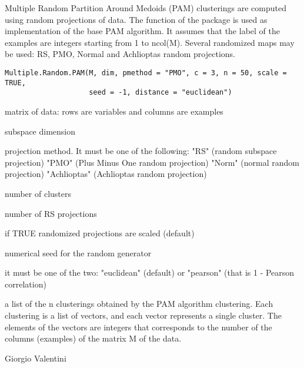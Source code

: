 \documentclass{article}
\begin{document}
\begin{Description}\relax
Multiple Random Partition Around Medoids (PAM) clusterings are computed using random projections of data.
The  function of the package  is used as implementation of the base PAM algorithm.
It assumes that the label of the examples are integers starting from 1 to ncol(M).
Several randomized maps may be used: RS, PMO, Normal and Achlioptas random projections.
\end{Description}
\begin{Usage}
\begin{verbatim}
Multiple.Random.PAM(M, dim, pmethod = "PMO", c = 3, n = 50, scale = TRUE, 
                    seed = -1, distance = "euclidean")
\end{verbatim}
\end{Usage}
\begin{Arguments}
\begin{ldescription}
\item[\code{M}] matrix of data: rows are variables and columns are examples 
\item[\code{dim}] subspace dimension 
\item[\code{pmethod}] projection method. It must be one of the following: 
"RS" (random subspace projection)
"PMO" (Plus Minus One random projection)
"Norm" (normal random projection)
"Achlioptas" (Achlioptas random projection) 
\item[\code{c}] number of clusters 
\item[\code{n}] number of RS projections 
\item[\code{scale}] if TRUE randomized projections are scaled (default) 
\item[\code{seed}] numerical seed for the random generator 
\item[\code{distance}] it must be one of the two: "euclidean" (default) or "pearson" (that is 1 - Pearson correlation) 
\end{ldescription}
\end{Arguments}
\begin{Value}
a list  of the n clusterings obtained by the PAM algorithm clustering. Each clustering is a list of vectors,
and each vector represents a single cluster. The elements of the vectors are integers that corresponds to the number
of the columns (examples) of the matrix M of the data.
\end{Value}
\begin{Author}\relax
Giorgio Valentini 
\end{Author}
\end{document}
